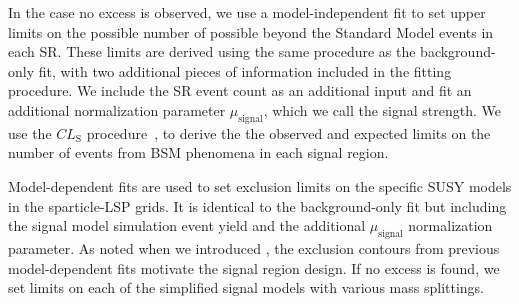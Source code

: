 In the case no excess is observed, we use a model-independent fit to set upper limits on the possible number of possible beyond the Standard Model events in each SR.
These limits are derived using the same procedure as the background-only fit, with two additional pieces of information included in the fitting procedure.
We include the SR event count as an additional input and fit an additional normalization parameter $\mu_{\text{signal}}$, which we call the signal strength.
We use the $CL_{\mathrm{S}}$ procedure~\cite{Feldman:1997qc}, to derive the the observed and expected limits on the number of events from BSM phenomena in each signal region.

Model-dependent fits are used to set exclusion limits on the specific SUSY models in the sparticle-LSP grids.
It is identical to the background-only fit but including the signal model simulation event yield and the additional $\mu_{\text{signal}}$ normalization parameter.
As noted when we introduced , the exclusion contours from previous model-dependent fits motivate the signal region design.
If no excess is found, we set limits on each of the simplified signal models with various mass splittings.

